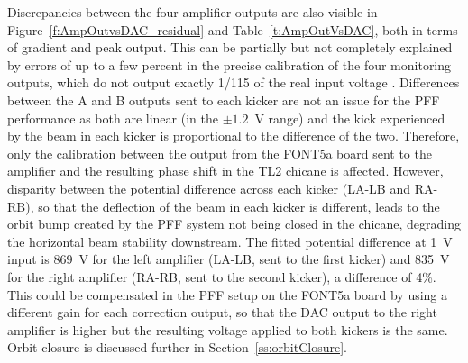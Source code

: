 Discrepancies between the four amplifier outputs are also visible in Figure~\ref{f:AmpOutvsDAC_residual} and Table~\ref{t:AmpOutVsDAC}, both in terms of gradient and peak output. This can be partially but not completely explained by errors of up to a few percent in the precise calibration of the four monitoring outputs, which do not output exactly 1/115 of the real input voltage \cite{colinPriv}. Differences between the A and B outputs sent to each kicker are not an issue for the PFF performance as both are linear (in the \(\pm1.2\)~V range) and the kick experienced by the beam in each kicker is proportional to the difference of the two. Therefore, only the calibration between the output from the FONT5a board sent to the amplifier and the resulting phase shift in the TL2 chicane is affected. However, disparity between the potential difference across each kicker (LA-LB and RA-RB), so that the deflection of the beam in each kicker is different, leads to the orbit bump created by the PFF system not being closed in the chicane, degrading the horizontal beam stability downstream. The fitted potential difference at 1~V input is 869~V for the left amplifier (LA-LB, sent to the first kicker) and 835~V for the right amplifier (RA-RB, sent to the second kicker), a difference of 4\%. This could be compensated in the PFF setup on the FONT5a board by using a different gain for each correction output, so that the DAC output to the right amplifier is higher but the resulting voltage applied to both kickers is the same. Orbit closure is discussed further in Section~\ref{ss:orbitClosure}.


